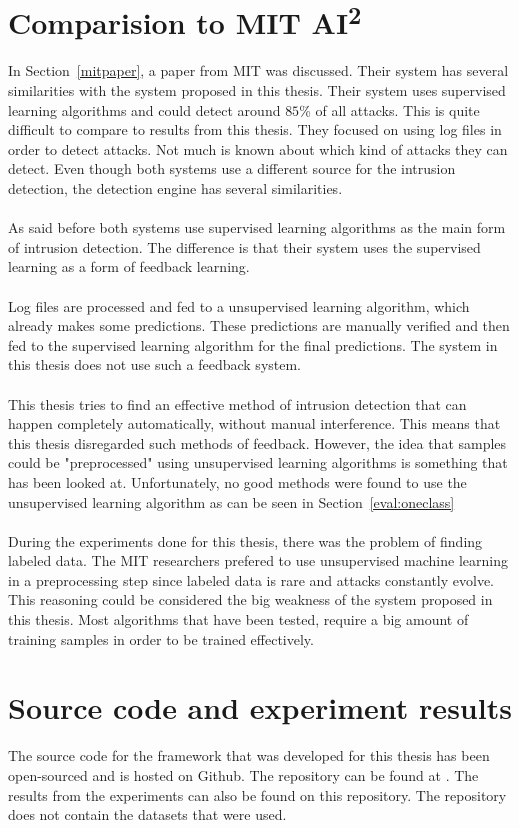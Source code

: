\section{Comparision to MIT AI\textsuperscript{2}}
\label{compAI}
In Section~\ref{mitpaper}, a paper from MIT was discussed. Their system has several similarities with the system proposed in this thesis. Their system uses supervised learning algorithms and could detect around $85$\% of all attacks. This is quite difficult to compare to results from this thesis. They focused on using log files in order to detect attacks. Not much is known about which kind of attacks they can detect. Even though both systems use a different source for the intrusion detection, the detection engine has several similarities. \\
\\
As said before both systems use supervised learning algorithms as the main form of intrusion detection. The difference is that their system uses the supervised learning as a form of feedback learning. \\
\\
Log files are processed and fed to a unsupervised learning algorithm, which already makes some predictions. These predictions are manually verified and then fed to the supervised learning algorithm for the final predictions. The system in this thesis does not use such a feedback system. \\
\\
This thesis tries to find an effective method of intrusion detection that can happen completely automatically, without manual interference. This means that this thesis disregarded such methods of feedback. However, the idea that samples could be "preprocessed" using unsupervised learning algorithms is something that has been looked at. Unfortunately, no good methods were found to use the unsupervised learning algorithm as can be seen in Section~\ref{eval:oneclass} \\
\\
During the experiments done for this thesis, there was the problem of finding labeled data. The MIT researchers prefered to use unsupervised machine learning in a preprocessing step since labeled data is rare and attacks constantly evolve. This reasoning could be considered the big weakness of the system proposed in this thesis. Most algorithms that have been tested, require a big amount of training samples in order to be trained effectively.

\section{Source code and experiment results}
The source code for the framework that was developed for this thesis has been open-sourced and is hosted on Github. The repository can be found at \cite{axelfaes}. The results from the experiments can also be found on this repository. The repository does not contain the datasets that were used. 
